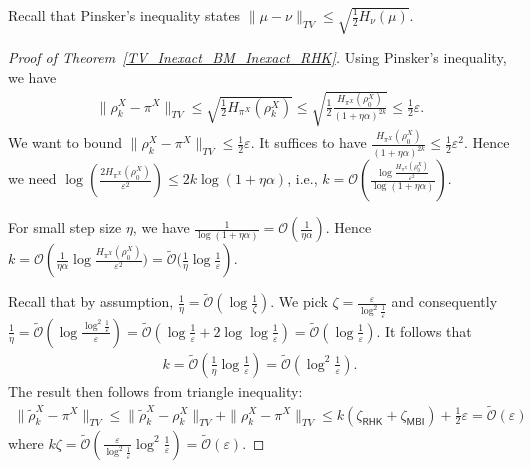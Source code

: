 Recall that Pinsker's inequality states $\|\mu - \nu\|_{TV} \le \sqrt{\frac{1}{2}H_{\nu}(\mu)}$.

\begin{proof}[Proof of Theorem~\ref{TV_Inexact_BM_Inexact_RHK}]  Using Pinsker's inequality, we have 
    \begin{align*}
        \|\rho_{k}^{X} - \pi^{X}\|_{TV} 
        \le \sqrt{\frac{1}{2} H_{\pi^{X}}(\rho_{k}^{X})} 
        \le \sqrt{\frac{1}{2} \frac{H_{\pi^{X}} (\rho_{0}^{X})}{(1 + \eta\alpha)^{2k} } }
        \le \frac{1}{2}\varepsilon.
    \end{align*}
    We want to bound $\|\rho_{k}^{X} - \pi^{X}\|_{TV} \le \frac{1}{2}\varepsilon$.
    It suffices to have $\frac{H_{\pi^{X}} (\rho_{0}^{X})}{(1 + \eta\alpha)^{2k} } \le \frac{1}{2} \varepsilon^{2}$.
    Hence we need $\log (\frac{2H_{\pi^{X}} (\rho_{0}^{X})}{\varepsilon^{2}}) \le 2k\log(1 + \eta\alpha) $, i.e., 
    $k = \mathcal{O}\left(\frac{\log \frac{H_{\pi^{X}} (\rho_{0}^{X})}{\varepsilon^{2}}}{\log (1 + \eta\alpha)}\right) $.

    
    For small step size $\eta$, we have $\frac{1}{\log(1 + \eta \alpha)} = \mathcal{O}(\frac{1}{\eta \alpha})$. 
    Hence $k = \mathcal{O}\left(\frac{1}{\eta \alpha} \log \frac{H_{\pi^{X}} (\rho_{0}^{X})}{\varepsilon^{2}}) = \tilde{\mathcal{O}}(\frac{1}{\eta}\log \frac{1}{\varepsilon}\right)$.

    Recall that by assumption, $\frac{1}{\eta} = \tilde{\mathcal{O}}(\log \frac{1}{\zeta})$. 
    We pick $\zeta = \frac{\varepsilon}{\log^{2} \frac{1}{\varepsilon}}$
    and consequently $\frac{1}{\eta} = \tilde{\mathcal{O}}(\log \frac{\log^{2} \frac{1}{\varepsilon}}{\varepsilon}) = \tilde{\mathcal{O}}(\log \frac{1}{\varepsilon} + 2\log \log \frac{1}{\varepsilon}) = \tilde{\mathcal{O}}(\log \frac{1}{\varepsilon})$.
    It follows that 
    \begin{align*}
        k = \tilde{\mathcal{O}}(\frac{1}{\eta}\log \frac{1}{\varepsilon})
        = \tilde{\mathcal{O}}(\log^{2} \frac{1}{\varepsilon}). 
    \end{align*}
    The result then follows from triangle inequality:
    \begin{align*}
        \|\tilde{\rho}_{k}^{X} - \pi^{X}\|_{TV} \le \|\tilde{\rho}_{k}^{X} - \rho_{k}^{X}\|_{TV} + \|\rho_{k}^{X} - \pi^{X}\|_{TV} 
        \le k (\zeta_{\mathsf{RHK}} + \zeta_{\mathsf{MBI}}) + \frac{1}{2}\varepsilon = \tilde{\mathcal{O}}(\varepsilon)
    \end{align*}
    where $k \zeta = \tilde{\mathcal{O}}(\frac{\varepsilon}{\log^{2} \frac{1}{\varepsilon}} \log^{2} \frac{1}{\varepsilon}) = \tilde{\mathcal{O}}(\varepsilon)$.

\end{proof}

